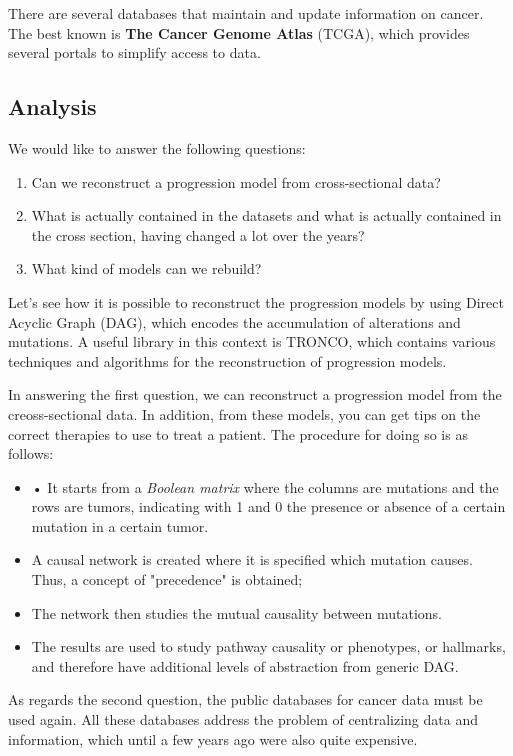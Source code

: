 There are several databases that maintain and update information on cancer. The best known is 
\textbf{The Cancer Genome Atlas} (TCGA), which provides several portals to simplify access to data.
\subsection{Analysis}
We would like to answer the following questions:
\begin{enumerate}
    \item Can we reconstruct a progression model from cross-sectional data?
    \item What is actually contained in the datasets and what is actually contained in the 
        cross section, having changed a lot over the years?
    \item What kind of models can we rebuild?
\end{enumerate}

Let’s see how it is possible to reconstruct the progression models by using Direct 
Acyclic Graph (DAG), which encodes the accumulation of alterations and mutations. A useful 
library in this context is TRONCO, which contains various techniques and algorithms for the 
reconstruction of progression models.

In answering the first question, we can reconstruct a progression model from the creoss-sectional 
data. In addition, from these models, you can get tips on the correct therapies to use to treat 
a patient. The procedure for doing so is as follows:
\begin{itemize}
    \item • It starts from a \textit{Boolean matrix} where the columns are mutations and the rows 
        are tumors, indicating with 1 and 0 the presence or absence of a certain mutation in a certain tumor.
    \item A causal network is created where it is specified which mutation causes. Thus, a concept of
        "precedence" is obtained;
    \item The network then studies the mutual causality between mutations.
    \item The results are used to study pathway causality or phenotypes, or hallmarks, and therefore 
        have additional levels of abstraction from generic DAG.
\end{itemize}

As regards the second question, the public databases for cancer data must be used again. All these
databases address the problem of centralizing data and information, which until a few years ago 
were also quite expensive.


